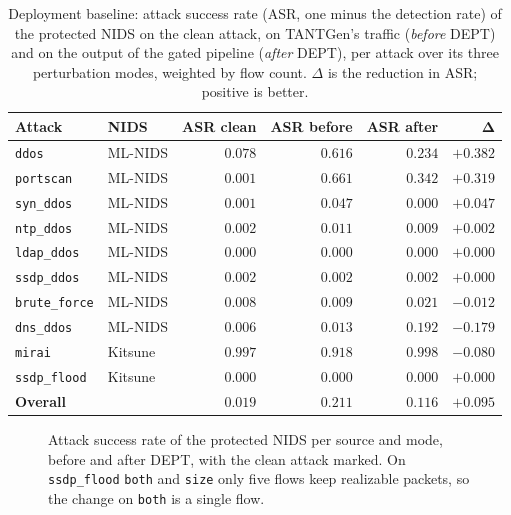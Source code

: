 \begin{table}[t]
\centering
\caption[Deployment baseline: attack success before vs.\ after DEPT]{Deployment baseline:
attack success rate (ASR, one minus the detection rate) of the protected NIDS on the
clean attack, on TANTGen's traffic (\emph{before} DEPT) and on the output of the gated
pipeline (\emph{after} DEPT), per attack over its three perturbation modes, weighted by
flow count. $\Delta$ is the reduction in ASR; positive is better.}
\label{tab:eval-baseline}
\setlength{\tabcolsep}{5pt}
\begin{tabular}{llrrrr}
\toprule
\textbf{Attack} & \textbf{NIDS} & \textbf{ASR clean} & \textbf{ASR before} & \textbf{ASR after} & $\mathbf{\Delta}$ \\
\midrule
\texttt{ddos}         & ML-NIDS & $0.078$ & $0.616$ & $0.234$ & $+0.382$ \\
\texttt{portscan}     & ML-NIDS & $0.001$ & $0.661$ & $0.342$ & $+0.319$ \\
\texttt{syn\_ddos}    & ML-NIDS & $0.001$ & $0.047$ & $0.000$ & $+0.047$ \\
\texttt{ntp\_ddos}    & ML-NIDS & $0.002$ & $0.011$ & $0.009$ & $+0.002$ \\
\texttt{ldap\_ddos}   & ML-NIDS & $0.000$ & $0.000$ & $0.000$ & $+0.000$ \\
\texttt{ssdp\_ddos}   & ML-NIDS & $0.002$ & $0.002$ & $0.002$ & $+0.000$ \\
\texttt{brute\_force} & ML-NIDS & $0.008$ & $0.009$ & $0.021$ & $-0.012$ \\
\texttt{dns\_ddos}    & ML-NIDS & $0.006$ & $0.013$ & $0.192$ & $-0.179$ \\
\texttt{mirai}        & Kitsune & $0.997$ & $0.918$ & $0.998$ & $-0.080$ \\
\texttt{ssdp\_flood}  & Kitsune & $0.000$ & $0.000$ & $0.000$ & $+0.000$ \\
\midrule
\textbf{Overall}      &         & $\mathbf{0.019}$ & $\mathbf{0.211}$ & $\mathbf{0.116}$ & $\mathbf{+0.095}$ \\
\bottomrule
\end{tabular}
\end{table}

\begin{figure}[htbp]
    \centering
    
    \caption[Deployment baseline: NIDS attack success before vs.\ after DEPT.]{Attack
    success rate of the protected NIDS per source and mode, before and after DEPT, with
    the clean attack marked. On \texttt{ssdp\_flood} \texttt{both} and \texttt{size} only
    five flows keep realizable packets, so the change on \texttt{both} is a single
    flow.}
    \label{fig:eval-baseline}
\end{figure}

